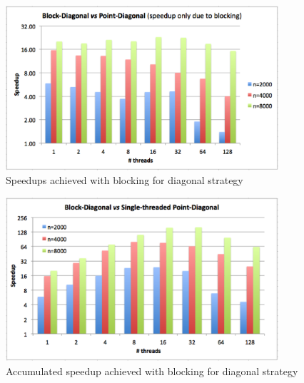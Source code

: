 \documentclass[../thesis]{subfiles}
\begin{document}
	\begin{figure}[hp]
		\begin{center}
			\includegraphics[width=0.9\textwidth]{assets/images/multicore/diagonal-speedup.png}
		\end{center}
		\caption{Speedups achieved with blocking for diagonal strategy}
		\label{fig:multicore:block:diagonal:speedup}
	\end{figure}

	\begin{figure}[hp]
		\begin{center}
			\includegraphics[width=0.9\textwidth]{assets/images/multicore/diagonal-block-stpoint-speedup.png}
		\end{center}
		\caption{Accumulated speedup achieved with blocking for diagonal strategy}
		\label{fig:multicore:block:diagonal:speedup:accumulated}
	\end{figure}
\end{document}
